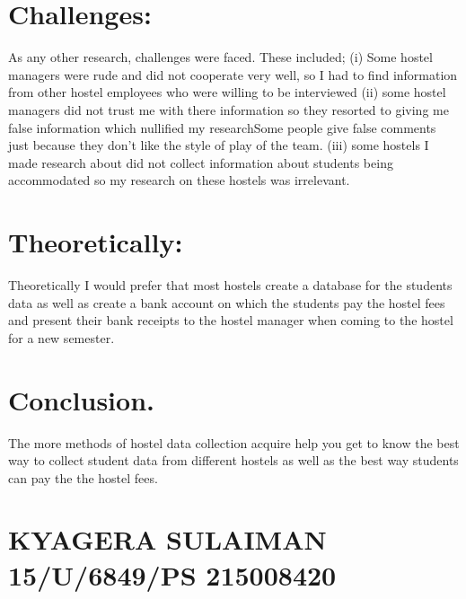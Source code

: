 \documentclass[24pt,a4paper]{article}
\begin{document}
\section{Challenges: }
As any other research, challenges were faced. These included;
(i)	Some hostel managers were rude and did not cooperate very well, so I had to find information from other hostel employees who were willing to be interviewed
(ii)	some hostel managers did not  trust me with there information so they resorted  to giving me false information which nullified my researchSome people give false comments just because they don’t like the style of play of the team.
(iii)	some hostels I made research about did not collect information about students being accommodated so my research on these hostels was irrelevant.


\section{Theoretically:}
Theoretically I would prefer that  most hostels create a database for the students data as well as create a bank account on which the   students pay the hostel fees and present their bank receipts to the hostel manager when coming to the hostel for a new semester. 

\section{Conclusion.}
The more methods of hostel data collection acquire help you get to know the best way to collect student data from different hostels as well as the best way students can pay the the hostel fees.


\section{KYAGERA SULAIMAN   15/U/6849/PS   215008420}
\end{document}
